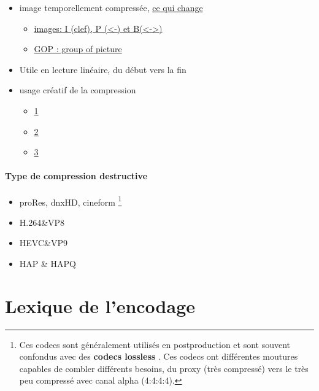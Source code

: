 \documentclass[
  french,
]{book}
\providecommand{\tightlist}{%
  \setlength{\itemsep}{0pt}\setlength{\parskip}{0pt}}
\begin{document}
\begin{itemize}
\tightlist
\item
  image temporellement compressée, \href{http://dvd-hq.info/data_compression_3.php}{ce qui change}

  \begin{itemize}
  \tightlist
  \item
    \href{https://en.wikipedia.org/wiki/Video_compression_picture_types}{images: I (clef), P (\textless-) et B(\textless-\textgreater)}
  \item
    \href{https://en.wikipedia.org/wiki/Inter_frame\#/media/File:IPB_images_sequence.png}{GOP : group of picture}
  \end{itemize}
\item
  Utile en lecture linéaire, du début vers la fin
\item
  usage créatif de la compression

  \begin{itemize}
  \tightlist
  \item
    \href{https://www.youtube.com/watch?v=rMSsw4CZvKg}{1}
  \item
    \href{https://www.youtube.com/watch?v=rSmEOk5AiN0}{2}
  \item
    \href{https://www.youtube.com/watch?v=dNa0-xrKi3Q}{3}
  \end{itemize}
\end{itemize}

\hypertarget{type-de-compression-destructive}{%
\paragraph{Type de compression destructive}\label{type-de-compression-destructive}}

\begin{itemize}
\tightlist
\item
  proRes, dnxHD, cineform \footnote{Ces codecs sont généralement utilisés en postproduction et sont souvent confondus avec des \textbf{codecs lossless }.
    Ces codecs ont différentes moutures capables de combler différents besoins, du proxy (très compressé) vers le très peu compressé avec canal alpha (4:4:4:4).}
\item
  H.264\&VP8
\item
  HEVC\&VP9\\
\item
  HAP \& HAPQ
\end{itemize}

\hypertarget{lexique_encodage}{%
\section{Lexique de l'encodage}\label{lexique_encodage}}
\end{document}
